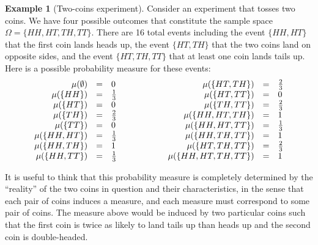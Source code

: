 \documentclass[12pt]{iopart}
\theoremstyle{plain}
\theoremstyle{definition}
\newtheorem{example}[thm]{Example}
\theoremstyle{remark}
\newcommand{\pmeas}{\ensuremath{\mu}}
\begin{document}
\begin{example}[Two-coins experiment]\label{ex1} Consider an
  experiment that tosses two coins. We have four possible outcomes
  that constitute the sample space $\Omega=\{HH,HT,TH,TT\}$. There are
  16 total events including the event $\{HH,HT\}$ that the first coin
  lands heads up, the event $\{HT,TH\}$ that the two coins land on
  opposite sides, and the event $\{HT,TH,TT\}$ that at least one coin
  lands tails up. Here is a possible probability measure for these
  events:
\begin{equation}
\begin{array}{c@{\qquad\qquad}c}
\begin{array}{rcl}
\pmeas(\emptyset) & = & 0\\
\pmeas(\{HH\}) & = & \frac{1}{3}\\
\pmeas(\{HT\}) & = & 0\\
\pmeas(\{TH\}) & = & \frac{2}{3}\\
\pmeas(\{TT\}) & = & 0\\
\pmeas(\{HH,HT\}) & = & \frac{1}{3}\\
\pmeas(\{HH,TH\}) & = & 1\\
\pmeas(\{HH,TT\}) & = & \frac{1}{3}
\end{array} & \begin{array}{rcl}
\pmeas(\{HT,TH\}) & = & \frac{2}{3}\\
\pmeas(\{HT,TT\}) & = & 0\\
\pmeas(\{TH,TT\}) & = & \frac{2}{3}\\
\pmeas(\{HH,HT,TH\}) & = & 1\\
\pmeas(\{HH,HT,TT\}) & = & \frac{1}{3}\\
\pmeas(\{HH,TH,TT\}) & = & 1\\
\pmeas(\{HT,TH,TT\}) & = & \frac{2}{3}\\
\pmeas(\{HH,HT,TH,TT\}) & = & 1
\end{array}\end{array}
\end{equation}
\end{example}

\noindent It is useful to think that this probability measure is
completely determined by the ``reality'' of the two coins in question
and their characteristics, in the sense that each pair of coins
induces a measure, and each measure must correspond to some pair of
coins. The measure above would be induced by two particular coins such
that the first coin is twice as likely to land tails up than heads up
and the second coin is double-headed. 
\end{document}
